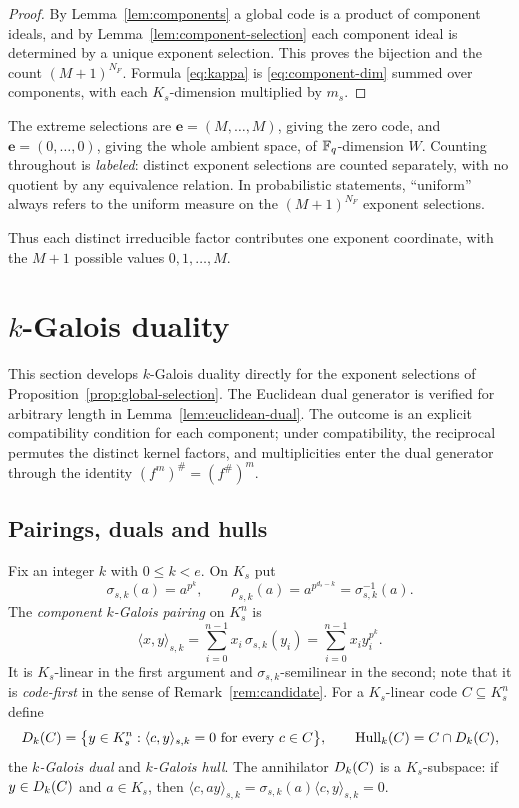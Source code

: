 \begin{proof}
By Lemma~\ref{lem:components} a global code is a product of component ideals,
and by Lemma~\ref{lem:component-selection} each component ideal is determined
by a unique exponent selection.  This proves the bijection and the count
$(M+1)^{N_F}$.  Formula \eqref{eq:kappa} is \eqref{eq:component-dim} summed
over components, with each $K_s$-dimension multiplied by $m_s$.
\end{proof}

The extreme selections are $\mathbf{e}=(M,\ldots,M)$, giving the zero code, and
$\mathbf{e}=(0,\ldots,0)$, giving the whole ambient space, of $\mathbb F_q$-dimension
$W$.  Counting throughout is \emph{labeled}: distinct exponent selections are
counted separately, with no quotient by any equivalence relation.  In
probabilistic statements, ``uniform'' always refers to the uniform measure on
the $(M+1)^{N_F}$ exponent selections.

Thus each distinct irreducible factor contributes one exponent coordinate,
with the $M+1$ possible values $0,1,\ldots,M$.

\section{\texorpdfstring{$k$}{k}-Galois duality}\label{sec:duality}

This section develops $k$-Galois duality directly for the exponent
selections of Proposition~\ref{prop:global-selection}.  The Euclidean dual
generator is verified for arbitrary length in
Lemma~\ref{lem:euclidean-dual}.  The outcome is an explicit compatibility
condition for each component; under compatibility, the reciprocal permutes
the distinct kernel factors, and multiplicities enter the dual generator
through the identity $(f^m)^{\#}=(f^{\#})^m$.

\subsection{Pairings, duals and hulls}\label{sec:pairing}

Fix an integer $k$ with $0\leq k<e$.  On $K_s$ put
\[
\sigma_{s,k}(a)=a^{p^k},\qquad
\rho_{s,k}(a)=a^{p^{d_s-k}}=\sigma_{s,k}^{-1}(a).
\]
The \emph{component $k$-Galois pairing} on $K_s^n$ is
\begin{equation}\label{eq:pairing}
\langle x,y\rangle_{s,k}
   =\sum_{i=0}^{n-1}x_i\,\sigma_{s,k}(y_i)
   =\sum_{i=0}^{n-1}x_i y_i^{p^k}.
\end{equation}
It is $K_s$-linear in the first argument and $\sigma_{s,k}$-semilinear in the
second; note that it is \emph{code-first} in the sense of
Remark~\ref{rem:candidate}.  For a $K_s$-linear code $C\subseteq K_s^n$ define
\[
D_k(C)=\bigl\{y\in K_s^n:\langle c,y\rangle_{s,k}=0
 \text{ for every }c\in C\bigr\},
\qquad
\operatorname{Hull}_k(C)=C\cap D_k(C),
\]
the \emph{$k$-Galois dual} and \emph{$k$-Galois hull}.  The annihilator
$D_k(C)$ is a $K_s$-subspace: if $y\in D_k(C)$ and $a\in K_s$, then
$\langle c,ay\rangle_{s,k}=\sigma_{s,k}(a)\langle c,y\rangle_{s,k}=0$.

